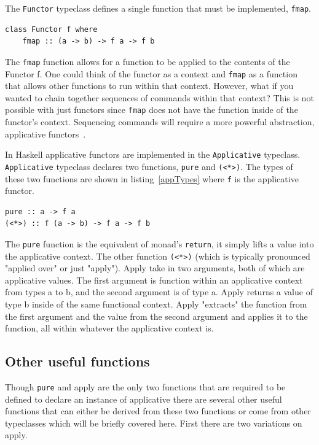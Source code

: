 The \texttt{Functor} typeclass defines a single function that must be implemented, \texttt{fmap}.

\begin{lstlisting}[frame=tblr]
class Functor f where
	fmap :: (a -> b) -> f a -> f b
\end{lstlisting}

The \texttt{fmap} function allows for a function to be applied to the contents of the Functor f. One could think of the functor as a context and \texttt{fmap} as a function that allows other functions to run within that context. However, what if you wanted to chain together sequences of commands within that context? This is not possible with just functors since \texttt{fmap} does not have the function inside of the functor's context. Sequencing commands will require a more powerful abstraction, applicative functors~\citep{realWorldHaskell}. 

In Haskell applicative functors are implemented in the \texttt{Applicative} typeclass. \texttt{Applicative} typeclass declares two functions, \texttt{pure} and \texttt{(<*>)}. The types of these two functions are shown in listing~\ref{appTypes} where \texttt{f} is the applicative functor. 

\begin{lstlisting}[frame=tblr,label=appTypes,caption={Types of Applicative's minimal complete definition}]
pure :: a -> f a
(<*>) :: f (a -> b) -> f a -> f b
\end{lstlisting}

The \texttt{pure} function is the equivalent of monad's \texttt{return}, it simply lifts a value into the applicative context. The other function \texttt{(<*>)} (which is typically pronounced "applied over" or just "apply"). Apply take in two arguments, both of which are applicative values. The first argument is function within an applicative context from types a to b, and the second argument is of type a. Apply returns a value of type b inside of the same functional context. Apply "extracts" the function from the first argument and the value from the second argument and applies it to the function, all within whatever the applicative context is.

\subsection{Other useful functions}

Though \texttt{pure} and apply are the only two functions that are required to be defined to declare an instance of applicative there are several other useful functions that can either be derived from these two functions or come from other typeclasses which will be briefly covered here. First there are two variations on apply.


